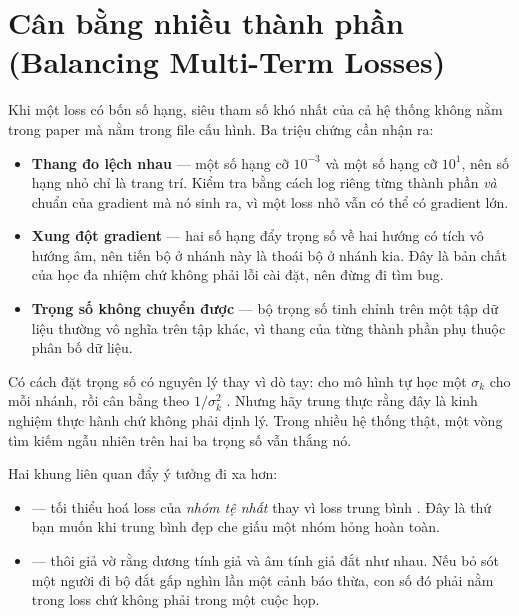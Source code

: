 \documentclass[../../deep_learning.tex]{subfiles}
\begin{document}
\section{Cân bằng nhiều thành phần (Balancing Multi-Term Losses)}

Khi một loss có bốn số hạng, siêu tham số khó nhất của cả hệ thống không nằm trong paper mà nằm trong file cấu hình. Ba triệu chứng cần nhận ra:

\begin{itemize}
\item \textbf{Thang đo lệch nhau} --- một số hạng cỡ \(10^{-3}\) và một số hạng cỡ \(10^{1}\), nên số hạng nhỏ chỉ là trang trí. Kiểm tra bằng cách log riêng từng thành phần \emph{và} chuẩn của gradient mà nó sinh ra, vì một loss nhỏ vẫn có thể có gradient lớn.
\item \textbf{Xung đột gradient} --- hai số hạng đẩy trọng số về hai hướng có tích vô hướng âm, nên tiến bộ ở nhánh này là thoái bộ ở nhánh kia. Đây là bản chất của học đa nhiệm chứ không phải lỗi cài đặt, nên đừng đi tìm bug.
\item \textbf{Trọng số không chuyển được} --- bộ trọng số tinh chỉnh trên một tập dữ liệu thường vô nghĩa trên tập khác, vì thang của từng thành phần phụ thuộc phân bố dữ liệu.
\end{itemize}

Có cách đặt trọng số có nguyên lý thay vì dò tay: cho mô hình tự học một \(\sigma_k\) cho mỗi nhánh, rồi cân bằng theo \(1/\sigma_k^2\) \cite{kendall2018multitask}. Nhưng hãy trung thực rằng đây là kinh nghiệm thực hành chứ không phải định lý. Trong nhiều hệ thống thật, một vòng tìm kiếm ngẫu nhiên trên hai ba trọng số vẫn thắng nó.

Hai khung liên quan đẩy ý tưởng đi xa hơn:

\begin{itemize}
\item \textbf{} --- tối thiểu hoá loss của \emph{nhóm tệ nhất} thay vì loss trung bình \cite{sagawa2020groupdro}. Đây là thứ bạn muốn khi trung bình đẹp che giấu một nhóm hỏng hoàn toàn.
\item \textbf{} --- thôi giả vờ rằng dương tính giả và âm tính giả đắt như nhau. Nếu bỏ sót một người đi bộ đắt gấp nghìn lần một cảnh báo thừa, con số đó phải nằm trong loss chứ không phải trong một cuộc họp.
\end{itemize}
\end{document}
